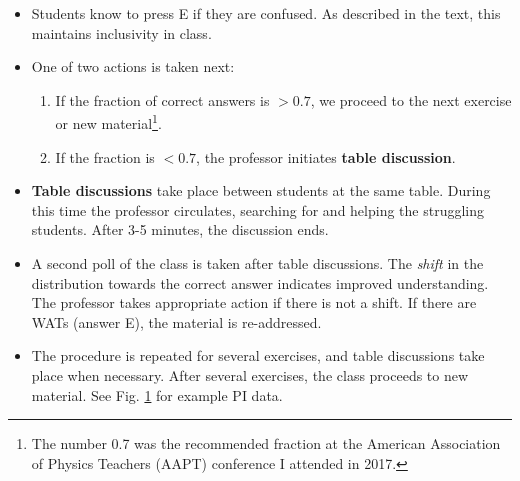 \documentclass[../../../main.tex]{subfiles}
\begin{document}
\begin{itemize}
\begin{figure}
\caption{\label{fig:exampleData} (Left) An answer distribution of my 25-student PHYS135A class (A was correct).  This distribution triggered a table discussion.  One student pressed E (indicating confusion) and I took appropriate action.  (Right) After table discussions, the students responded and the fraction of correct answers was 22/25 = 0.88.}
\end{figure}
\item Students know to press E if they are confused.  As described in the text, this maintains inclusivity in class.
\item One of two actions is taken next:
\begin{enumerate}
\item If the fraction of correct answers is $>0.7$, we proceed to the next exercise or new material\footnote{The number 0.7 was the recommended fraction at the American Association of Physics Teachers (AAPT) conference I attended in 2017.}.
\item If the fraction is $<0.7$, the professor initiates \textbf{table discussion}.
\end{enumerate}
\item \textbf{Table discussions} take place between students at the same table.  During this time the professor circulates, searching for and helping the struggling students.  After 3-5 minutes, the discussion ends.
\item A second poll of the class is taken after table discussions.  The \textit{shift} in the distribution towards the correct answer indicates improved understanding.  The professor takes appropriate action if there is not a shift.  If there are WATs (answer E), the material is re-addressed.
\item The procedure is repeated for several exercises, and table discussions take place when necessary.  After several exercises, the class proceeds to new material. See Fig. \ref{fig:exampleData} for example PI data.
\end{itemize}
\end{document}
